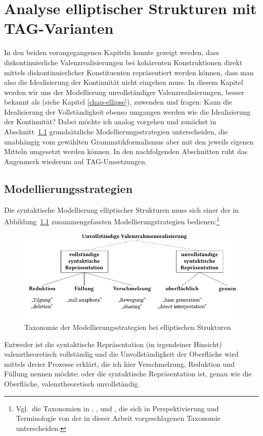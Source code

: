 \chapter{Analyse elliptischer Strukturen mit TAG-Varianten} \label{sec-ellipsenanalyse}


In den beiden vorangegangenen Kapiteln konnte gezeigt werden, dass diskontinuierliche Valenzrealisierungen bei kohärenten Konstruktionen direkt mittels diskontinuierlicher Konstituenten repräsentiert werden können, dass man also die Idealisierung der Kontinuität nicht eingehen muss. In diesem Kapitel werden wir uns der Modellierung unvollständiger Valenzrealisierungen, besser bekannt als  (siehe Kapitel \ref{chap-ellipse}), zuwenden und fragen: Kann die Idealisierung der Vollständigkeit ebenso umgangen werden wie die Idealisierung der Kontinuität? Dabei möchte ich analog vorgehen und zunächst in Abschnitt~\ref{sec-ellipsenanalyse-wege} grundsätzliche Modellierungsstrategien unterscheiden, die unabhängig vom gewählten Grammatikformalismus aber mit den jeweils eigenen Mitteln umgesetzt werden können. In den nachfolgenden Abschnitten ruht das Augenmerk wiederum auf TAG-Umsetzungen. 



\section{Modellierungsstrategien} \label{sec-ellipsenanalyse-wege}

Die syntaktische Modellierung elliptischer Strukturen muss sich einer der in Abbildung~\ref{fig-ellipse-strategien} zusammengefassten Modellierungstrategien bedienen:\footnote{Vgl.\ die Taxonomien in \citet[768f,788f]{Klein:93}, \citet[16ff]{Schwabe:94}, \citet[5]{Winkler:Schwabe:03} und \citet[2]{Aelbrecht:10}, die sich in Perspektivierung und Terminologie von der in dieser Arbeit vorgeschlagenen Taxonomie unterscheiden.}
\begin{figure}[t]
\centering
\includegraphics{graphics/abb81.pdf}
\caption{\label{fig-ellipse-strategien}Taxonomie der Modellierungsstrategien bei elliptischen Strukturen}
\end{figure}
Entweder ist die syntaktische Repräsentation (in irgendeiner Hinsicht) valenztheoretisch vollständig und die Unvollständigkeit der Oberfläche wird mittels dreier Prozesse erklärt, die ich hier Verschmelzung, Reduktion und Füllung nennen möchte; oder die syntaktische Repräsentation ist, genau wie die Oberfläche, valenztheoretisch unvollständig.

